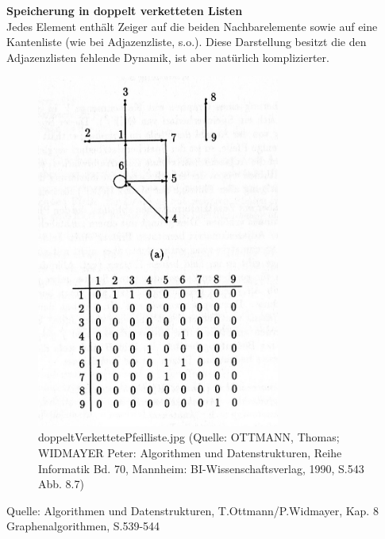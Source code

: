 \documentclass[a4paper,12pt]{article}
\begin{document}
\textbf{Speicherung in doppelt verketteten Listen}\\
Jedes Element enthält Zeiger auf die beiden Nachbarelemente sowie auf eine Kantenliste (wie bei Adjazenzliste, s.o.).
Diese Darstellung besitzt die den Adjazenzlisten fehlende Dynamik, ist aber natürlich komplizierter.

\begin{figure}[h]
\centering
\includegraphics[width = 8cm]{adjazenzmatrix.jpg}
\caption{doppeltVerkettetePfeilliste.jpg {\tiny (Quelle: OTTMANN, Thomas; WIDMAYER Peter: Algorithmen und Datenstrukturen, Reihe Informatik Bd. 70, Mannheim: BI-Wissenschaftsverlag, 1990, S.543 Abb. 8.7)} }
\label{a4}
\end{figure}

Quelle:
Algorithmen und Datenstrukturen, T.Ottmann/P.Widmayer, Kap. 8 Graphenalgorithmen, S.539-544
\end{document}
